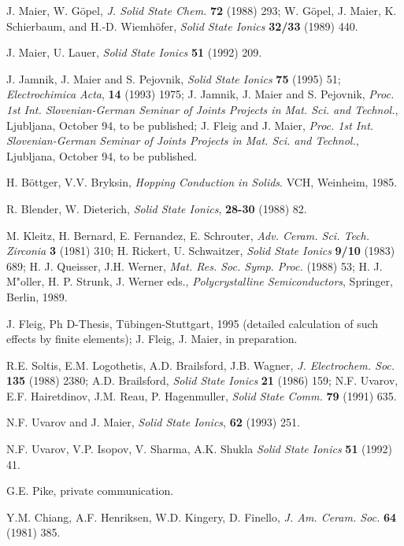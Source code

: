 \documentclass{elsart}
\begin{document}
\begin{thebibliography}{999}
 J. Maier, W. G\"opel, {\em J. Solid State Chem.\/} {\bf 72} 
(1988) 293; W. G\"opel, J. Maier, K. Schierbaum, and H.-D. Wiemh\"ofer, {\em
  Solid State Ionics\/} {\bf 32/33} (1989) 440.

 J. Maier, U. Lauer, {\em Solid State Ionics\/} {\bf 51} (1992)
  209. 

 J. Jamnik, J. Maier and S. Pejovnik, {\em Solid State Ionics\/}
  {\bf 75} (1995) 51; {\em Electrochimica Acta\/}, {\bf 14} (1993) 1975;
  J. Jamnik, J. Maier and S. Pejovnik, {\em Proc. 1st Int. Slovenian-German 
Seminar of Joints Projects in Mat. Sci. and Technol.\/}, Ljubljana, October
94, to be published; J. Fleig and J. Maier, {\em Proc. 1st
  Int. Slovenian-German Seminar of Joints Projects in Mat. Sci. and
  Technol.\/}, Ljubljana, October 94, to be published.  

 H. B\"ottger, V.V. Bryksin, {\em Hopping Conduction in Solids\/}.
VCH, Weinheim, 1985.  

 R. Blender, W. Dieterich, {\em Solid State Ionics\/}, {\bf 28-30} 
(1988) 82.

 M. Kleitz, H. Bernard, E. Fernandez, E. Schrouter, {\em Adv.
  Ceram. Sci. Tech. Zirconia\/} {\bf 3} (1981) 310; H. Rickert, U. Schwaitzer,
{\em Solid State Ionics\/} {\bf 9/10} (1983) 689; H. J. Queisser, J.H. Werner,
{\em Mat. Res. Soc. Symp. Proc.\/} (1988) 53; H. J. M"oller, H. P. Strunk,
J. Werner eds., {\em Polycrystalline Semiconductors\/}, Springer, Berlin,
1989. 

 J. Fleig, Ph D-Thesis, T\"ubingen-Stuttgart, 1995 (detailed
  calculation of such effects by finite elements); J. Fleig, J. Maier, in
  preparation. 

 R.E. Soltis, E.M. Logothetis, A.D. Brailsford, J.B.
Wagner, {\em J. Electrochem. Soc.\/} {\bf 135} (1988) 2380; A.D. Brailsford, 
{\em Solid State Ionics} {\bf 21} (1986) 159; N.F. Uvarov, E.F. Hairetdinov,
J.M. Reau, P. Hagenmuller, {\em Solid State Comm.\/} {\bf 79} (1991) 635. 

 N.F. Uvarov and J. Maier, {\em Solid State Ionics\/}, {\bf 62}
  (1993) 251. 

 N.F. Uvarov, V.P. Isopov, V. Sharma, A.K. Shukla {\em Solid
State Ionics\/} {\bf 51} (1992) 41. 

 G.E. Pike, private communication.

 Y.M. Chiang, A.F. Henriksen, W.D. Kingery, D. Finello, {\em J.
Am. Ceram. Soc.\/} {\bf 64} (1981) 385.


\end{thebibliography}
\end{document}
